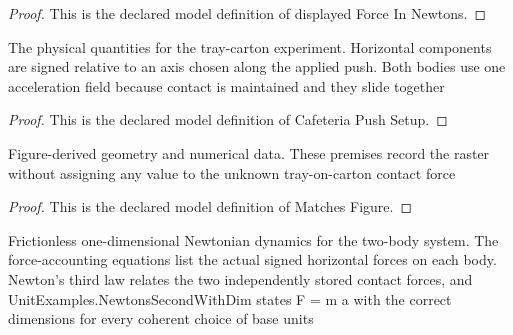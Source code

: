 \begin{proof}
  This is the declared model definition of displayed Force In Newtons.
\end{proof}
\begin{definition}
  \label{def:physics:phyx-mini-0804:phyxminiproblems-problemphyxmini0804-cafeteriapushsetup}
  The physical quantities for the tray-carton experiment. Horizontal components are signed relative to an axis chosen along the applied push. Both bodies use one acceleration field because contact is maintained and they slide together
\end{definition}
\begin{proof}
  This is the declared model definition of Cafeteria Push Setup.
\end{proof}
\begin{definition}
  \label{def:physics:phyx-mini-0804:phyxminiproblems-problemphyxmini0804-matchesfigure}
  Figure-derived geometry and numerical data. These premises record the raster without assigning any value to the unknown tray-on-carton contact force
\end{definition}
\begin{proof}
  This is the declared model definition of Matches Figure.
\end{proof}
\begin{definition}
  \label{def:physics:phyx-mini-0804:phyxminiproblems-problemphyxmini0804-satisfiesfrictionlessnewtoniandynamics}
  Frictionless one-dimensional Newtonian dynamics for the two-body system. The force-accounting equations list the actual signed horizontal forces on each body. Newton's third law relates the two independently stored contact forces, and UnitExamples.NewtonsSecondWithDim states F = m a with the correct dimensions for every coherent choice of base units
\end{definition}
